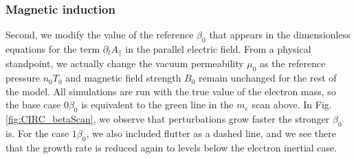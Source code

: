 \subsubsection{Magnetic induction}

Second, we modify the value of the reference $\beta_0$ that appears in the dimensionless equations for the term $\partial_t A_\parallel$ in the parallel electric field. From a physical standpoint, we actually change the vacuum permeability $\mu_0$ as the reference pressure $n_0T_0$ and magnetic field strength $B_0$ remain unchanged for the rest of the model. All simulations are run with the true value of the electron mass, so the base case $0\beta_0$ is equivalent to the green line in the $m_e$ scan above. In Fig. \ref{fig:CIRC_betaScan}, we observe that perturbations grow faster the stronger $\beta_0$ is. For the case $1\beta_0$, we also included flutter as a dashed line, and we see there that the growth rate is reduced again to levels below the electron inertial case. 

